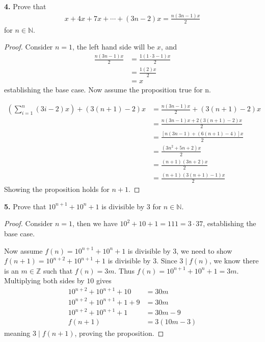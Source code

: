 \documentclass[12pt]{amsart}
\newenvironment{statement}[1]{\smallskip\noindent\color[rgb]{1.00,0.00,0.50} {\bf #1.}}{}
\theoremstyle{definition}
\theoremstyle{remark}
\newcommand{\BZ}{\mathbb Z}
\newcommand{\BN}{\mathbb N}
\begin{document}
\begin{statement}{4}
  Prove that
  \begin{align*}
    x + 4x + 7x + \cdots + (3n-2)x = \frac{n(3n-1)x}{2}
  \end{align*}
  for $n \in \BN$.
\end{statement}
\begin{proof}
  Consider $n=1$, the left hand side will be $x$, and
  \begin{align*}
    \frac{n(3n-1)x}{2} &= \frac{1(1\cdot 3 -1)x}{2} \\
    &= \frac{1(2)x}{2} \\
    &= x
  \end{align*}
  establishing the base case. Now assume the proposition true for n.

  \begin{align*}
    \left (\sum_{i=1}^n (3i-2)x \right ) + (3(n+1) -2)x &= \frac{n(3n-1)x}{2}+(3(n+1) -2)x\\
    &= \frac{n(3n-1)x +2(3(n+1) -2)x}{2}\\
    &= \frac{[n(3n-1) +(6(n+1) -4)]x}{2}\\
    &= \frac{(3n^2+5n+2)x}{2}\\
    &= \frac{(n+1)(3n+2)x}{2}\\
    &= \frac{(n+1)(3(n+1) - 1)x}{2}
  \end{align*}
  Showing the proposition holds for $n+1$.
\end{proof}

\begin{statement}{5}
  Prove that $10^{n+1} + 10^n + 1$ is divisible by $3$ for $n \in \BN$.
\end{statement}
\begin{proof}
  Consider $n=1$, then we have $10^2 + 10 + 1 = 111 = 3\cdot 37$, establishing the base case.

  Now assume $f(n) = 10^{n+1} + 10^n + 1$ is divisible by $3$, we need
  to show $f(n+1) = 10^{n+2} + 10^{n+1} + 1$ is divisible by
  $3$. Since $3 \mid f(n)$, we know there is an $m \in \BZ$ such that
  $f(n) = 3m$. Thus $f(n) = 10^{n+1} + 10^n + 1 = 3m$. Multiplying
  both sides by $10$ gives
  \begin{align*}
    10^{n+2} + 10^{n+1} + 10 &= 30m \\
    10^{n+2} + 10^{n+1} + 1 + 9 &= 30m \\
    10^{n+2} + 10^{n+1} + 1  &= 30m - 9 \\
    f(n+1)  &= 3(10m - 3)
  \end{align*}
  meaning $3 \mid f(n+1)$, proving the proposition.
\end{proof}
\end{document}
